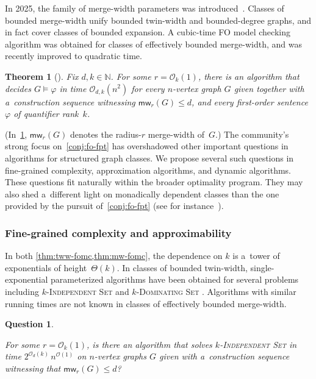 \documentclass[a4paper,11pt]{article}
\newcommand{\fo}{\textsf{FO}\xspace}
\newcommand{\mw}{\mathsf{mw}}
\newcommand{\Oh}{\mathcal{O}}
\newtheorem{quest}{Question}
\newenvironment{question}
  {\begin{quest}\begin{mdframed}[style=questionstyle]}
  {\end{mdframed}\end{quest}}
\newtheorem{theorem}{Theorem}
\begin{document}
In 2025, the family of merge-width parameters was introduced~\cite{DreierT25}.
Classes of bounded merge-width unify bounded twin-width and bounded-degree graphs, and in fact cover classes of bounded expansion.
A cubic-time \fo model checking algorithm was obtained for classes of effectively bounded merge-width, and was recently improved to quadratic time. 

\begin{theorem}[\cite{DreierT25,BonnetGKM26}]\label{thm:mw-fomc}
  Fix $d, k \in \mathbb N$.
  For some $r = \Oh_k(1)$, there is an algorithm that decides $G \models \varphi$ in time $\Oh_{d,k}(n^2)$ for every $n$-vertex graph $G$ given together with a~construction sequence witnessing $\mw_r(G) \leqslant d$, and every first-order sentence $\varphi$ of quantifier rank~$k$.
\end{theorem}

(In~\cref{thm:mw-fomc}, $\mw_r(G)$ denotes the radius-$r$ merge-width of~$G$.)
The community's strong focus on~\cref{conj:fo-fpt} has overshadowed other important questions in algorithms for structured graph classes.  
We propose several such questions in fine-grained complexity, approximation algorithms, and dynamic algorithms.
These questions fit naturally within the broader optimality program.
They may also shed a~different light on monadically dependent classes than the one provided by the pursuit of~\cref{conj:fo-fpt} (see for instance~\cite{DreierMT24}).

\subsubsection{Fine-grained complexity and approximability}\label{subsec:fgc-tww-mw}

In both \cref{thm:tww-fomc,thm:mw-fomc}, the dependence on $k$ is a~tower of exponentials of height~$\Theta(k)$.
In classes of bounded twin-width, single-exponential parameterized algorithms have been obtained for several problems including \textsc{$k$-Independent Set} and \textsc{$k$-Dominating Set} \cite{twin-width3}.
Algorithms with similar running times are not known in classes of effectively bounded merge-width.

\begin{question}\label{q:k-is-mw}
  For some $r = \Oh_k(1)$, is there an algorithm that solves \textsc{$k$-Independent Set} in time $2^{\Oh_d(k)}\,n^{\Oh(1)}$ on $n$-vertex graphs $G$ given with a~construction sequence witnessing that $\mw_r(G) \leqslant d$?
\end{question}
\end{document}
